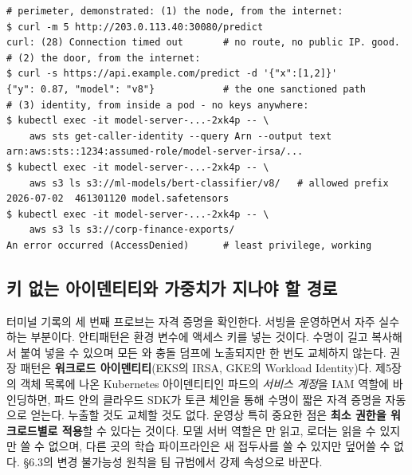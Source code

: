 \begin{terminalbox}
\begin{Verbatim}[breaklines=true,breakanywhere=true,fontsize=\small,formatcom=\color{tbbtermfg},codes=\tbbcodeactive]
# perimeter, demonstrated: (1) the node, from the internet:
$ curl -m 5 http://203.0.113.40:30080/predict
curl: (28) Connection timed out       # no route, no public IP. good.
# (2) the door, from the internet:
$ curl -s https://api.example.com/predict -d '{"x":[1,2]}'
{"y": 0.87, "model": "v8"}            # the one sanctioned path
# (3) identity, from inside a pod - no keys anywhere:
$ kubectl exec -it model-server-...-2xk4p -- \
    aws sts get-caller-identity --query Arn --output text
arn:aws:sts::1234:assumed-role/model-server-irsa/...
$ kubectl exec -it model-server-...-2xk4p -- \
    aws s3 ls s3://ml-models/bert-classifier/v8/   # allowed prefix
2026-07-02  461301120 model.safetensors
$ kubectl exec -it model-server-...-2xk4p -- \
    aws s3 ls s3://corp-finance-exports/
An error occurred (AccessDenied)      # least privilege, working
\end{Verbatim}
\end{terminalbox}

\subsection*{키 없는 아이덴티티와 가중치가 지나야 할 경로}

터미널 기록의 세 번째 프로브는 자격 증명을 확인한다. 서빙을 운영하면서 자주 실수하는 부분이다. 안티패턴은 환경 변수에 액세스 키를 넣는 것이다. 수명이 길고 복사해서 붙여 넣을 수 있으며 모든 와 충돌 덤프에 노출되지만 한 번도 교체하지 않는다. 권장 패턴은 \textbf{워크로드 아이덴티티}(EKS의 IRSA, GKE의 Workload Identity)다. 제5장의 객체 목록에 나온 Kubernetes 아이덴티티인 파드의 \textit{서비스 계정}을 IAM 역할에 바인딩하면, 파드 안의 클라우드 SDK가 토큰 체인을 통해 수명이 짧은 자격 증명을 자동으로 얻는다. 누출할 것도 교체할 것도 없다. 운영상 특히 중요한 점은 \textbf{최소 권한을 워크로드별로 적용}할 수 있다는 것이다. 모델 서버 역할은 만 읽고, 로더는 읽을 수 있지만 쓸 수 없으며, 다른 곳의 학습 파이프라인은 새 접두사를 쓸 수 있지만 덮어쓸 수 없다. §6.3의 변경 불가능성 원칙을 팀 규범에서 강제 속성으로 바꾼다.

